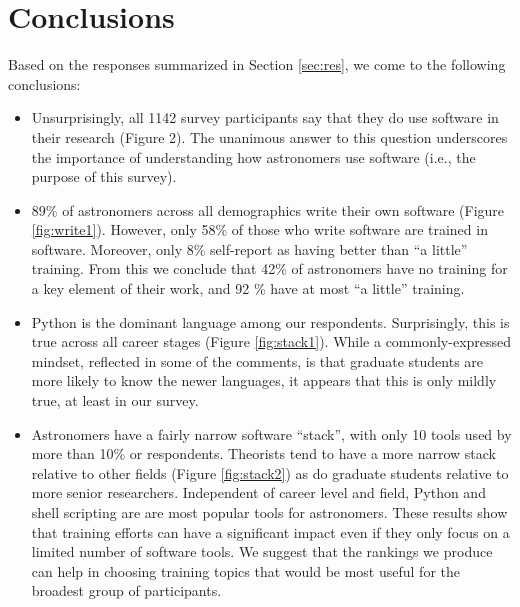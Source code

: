 
\section{Conclusions}
\label{sec:conc}


Based on the responses summarized in Section \ref{sec:res}, we come to the following conclusions:



\begin{itemize}
\item Unsurprisingly, all 1142 survey participants say that they do use software in their research (Figure 2). The unanimous answer to this question underscores the importance of understanding how astronomers use software (i.e., the purpose of this survey).
\item $89\%$ of astronomers across all demographics write their own software (Figure \ref{fig:write1}).  However, only 58\% of those who write software are trained in software.  Moreover, only 8\% self-report as having better than ``a little'' training.  From this we conclude that 42\% of astronomers have no training for a key element of their work, and 92 \% have at most ``a little'' training.  
\item Python is the dominant language among our respondents.  Surprisingly, this is true across all career stages (Figure \ref{fig:stack1}).  While a commonly-expressed mindset, reflected in some of the comments, is that graduate students are more likely to know the newer languages, it appears that this is only mildly true, at least in our survey. 
\item Astronomers have a fairly narrow software ``stack'', with only 10 tools used by more than 10\% or respondents. Theorists tend to have a  more narrow stack relative to other fields (Figure \ref{fig:stack2}) as do graduate students relative to more senior researchers. Independent of career level and field, Python and shell scripting are are most popular tools for astronomers. These results show that training efforts can have a significant impact even if they only focus on a limited number of software tools. We suggest that the rankings we produce can help in choosing training topics that would be most useful for the broadest group of participants. 
\end{itemize}

